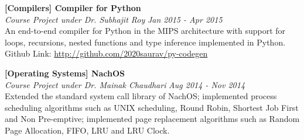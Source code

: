 \documentclass[margin,10pt]{resume}
\begin{document}
\begin{resume}
\begin{list2}
	\vspace{4mm}

\item \textbf{[Compilers] Compiler for Python}\\
	\textsl{Course Project under Dr. Subhajit Roy} \hfill \emph{Jan 2015 - Apr 2015}\\
	An end-to-end compiler for Python in the MIPS architecture with support for loops, recursions, nested functions and type inference implemented in Python.\\
	 Github Link: \url{http://github.com/2020saurav/py-codegen}

	\vspace{4mm}

\item \textbf{[Operating Systems] NachOS}\\
	\textsl{Course Project under Dr. Mainak Chaudhari} \hfill \emph{Aug 2014 - Nov 2014}\\
	Extended the standard system call library of NachOS; implemented process scheduling algorithms such as UNIX scheduling, Round Robin, Shortest Job First and Non Pre-emptive; implemented page replacement algorithms such as Random Page Allocation, FIFO, LRU and LRU Clock.

	\vspace{4mm}




\end{list2}
\end{resume}
\end{document}
